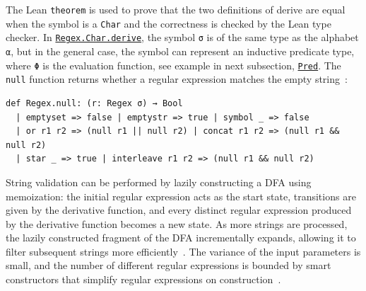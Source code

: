 \documentclass[runningheads]{llncs}
\newcommand{\link}[2]{\mbox{\hyperref[#2]{\lstinline{#1}}}\xspace}
\newcommand{\RegexCharDerive}{\link{Regex.Char.derive}{def Regex.Char.derive}}
\newcommand{\AnyEqPred}{\link{Pred}{AnyEqPred}}
\newcommand{\DFA}{\ac{DFA}\xspace}
\begin{document}
The Lean \lstinline{theorem} is used to prove that the two definitions of derive are equal when the symbol is a \lstinline{Char} and the correctness is checked by the Lean type checker.
In \RegexCharDerive, the symbol \lstinline{σ} is of the same type as the alphabet \lstinline{α}, but in the general case, the symbol can represent an inductive predicate type, where \lstinline{Φ} is the evaluation function, see example in next subsection, \AnyEqPred.
The \lstinline{null} function returns whether a regular expression matches the empty string~\cite{brzozowski1964derivatives,elliott2021symbolic,reexamined}:
\begin{lstlisting}[label=def Regex.null]
def Regex.null: (r: Regex σ) → Bool
  | emptyset => false | emptystr => true | symbol _ => false
  | or r1 r2 => (null r1 || null r2) | concat r1 r2 => (null r1 && null r2)
  | star _ => true | interleave r1 r2 => (null r1 && null r2)
\end{lstlisting}
String validation can be performed by lazily constructing a \DFA using memoization: the initial regular expression acts as the start state, transitions are given by the derivative function, and every distinct regular expression produced by the derivative function becomes a new state. 
As more strings are processed, the lazily constructed fragment of the \DFA incrementally expands, allowing it to filter subsequent strings more efficiently~\cite{reexamined}.
The variance of the input parameters is small, and the number of different regular expressions is bounded by smart constructors that simplify regular expressions on construction~\cite{reexamined}.
\end{document}
